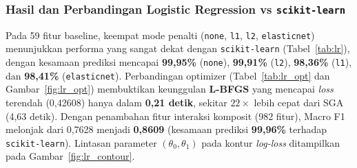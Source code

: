 \documentclass[11pt,a4paper]{article}
\numberwithin{figure}{section}
\numberwithin{table}{section}
\begin{document}
\subsubsection{Hasil dan Perbandingan Logistic Regression vs \texttt{scikit-learn}}

Pada 59 fitur baseline, keempat mode penalti (\texttt{none}, \texttt{l1}, \texttt{l2}, \texttt{elasticnet}) menunjukkan performa yang sangat dekat dengan \texttt{scikit-learn} (Tabel~\ref{tab:lr}), dengan kesamaan prediksi mencapai \textbf{99,95\%} (\texttt{none}), \textbf{99,91\%} (\texttt{l2}), \textbf{98,36\%} (\texttt{l1}), dan \textbf{98,41\%} (\texttt{elasticnet}). Perbandingan optimizer (Tabel~\ref{tab:lr_opt} dan Gambar~\ref{fig:lr_opt}) membuktikan keunggulan \textbf{L-BFGS} yang mencapai \textit{loss} terendah (0,42608) hanya dalam \textbf{0,21 detik}, sekitar $22\times$ lebih cepat dari SGA (4,63 detik). Dengan penambahan fitur interaksi komposit (982 fitur), Macro F1 melonjak dari 0,7628 menjadi \textbf{0,8609} (kesamaan prediksi \textbf{99,96\%} terhadap \texttt{scikit-learn}). Lintasan parameter $(\theta_0, \theta_1)$ pada kontur \textit{log-loss} ditampilkan pada Gambar~\ref{fig:lr_contour}.
\end{document}
